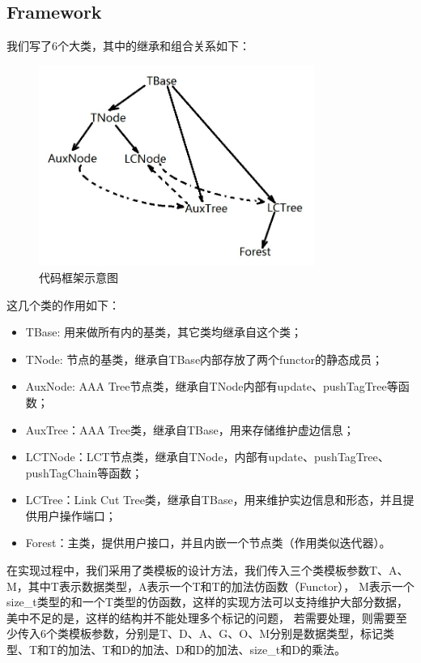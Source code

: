﻿\documentclass{article}
\begin{document}
	\subsection{Framework}
	我们写了6个大类，其中的继承和组合关系如下：\par
	\begin{figure}[!htbp]
		\centering
		\includegraphics[width=9.0cm]{Framework.jpg}
		\caption{代码框架示意图}
	\end{figure}
	这几个类的作用如下：
	\begin{itemize}
		\item TBase: 用来做所有内的基类，其它类均继承自这个类；
		\item TNode: 节点的基类，继承自TBase内部存放了两个functor的静态成员；
		\item AuxNode: AAA Tree节点类，继承自TNode内部有update、pushTagTree等函数；
		\item AuxTree：AAA Tree类，继承自TBase，用来存储维护虚边信息；
		\item LCTNode：LCT节点类，继承自TNode，内部有update、pushTagTree、pushTagChain等函数；
		\item LCTree：Link Cut Tree类，继承自TBase，用来维护实边信息和形态，并且提供用户操作端口；
		\item Forest：主类，提供用户接口，并且内嵌一个节点类（作用类似迭代器）。
	\end{itemize}
	\indent 在实现过程中，我们采用了类模板的设计方法，我们传入三个类模板参数T、A、M，其中T表示数据类型，A表示一个T和T的加法仿函数（Functor），
	M表示一个size\_t类型的和一个T类型的仿函数，这样的实现方法可以支持维护大部分数据，美中不足的是，这样的结构并不能处理多个标记的问题，
	若需要处理，则需要至少传入6个类模板参数，分别是T、D、A、G、O、M分别是数据类型，标记类型、T和T的加法、T和D的加法、D和D的加法、size\_t和D的乘法。
	\newpage
	
	
\end{document}
